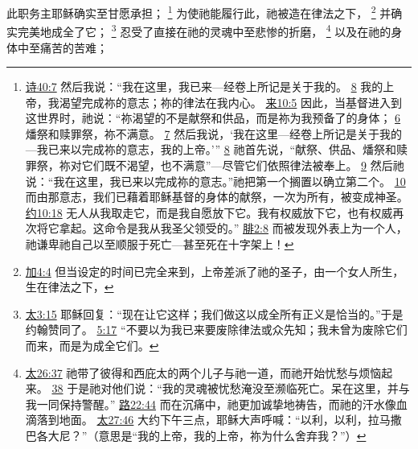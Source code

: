 \documentclass[12pt, a4paper, oneside]{ctexart}
\newcounter{parnum}[section]
\newcommand{\N}{%
   \noindent\refstepcounter{parnum}%
    \makebox[\parindent][l]{\textbf{\arabic{parnum}.}}}
\begin{document}
\N 此职务主耶稣确实至甘愿承担；
	\footnote {
		\href{https://biblehub.com/psalms/40-7.htm}{诗40:7} 然后我说：“我在这里，我已来---经卷上所记是关于我的。
		\href{https://biblehub.com/psalms/40-8.htm}{8} 我的上帝，我渴望完成祢的意志；祢的律法在我内心。
		\href{https://biblehub.com/hebrews/10-5.htm}{来10:5} 因此，当基督进入到这世界时，祂说：“祢渴望的不是献祭和供品，而是祢为我预备了的身体；
		\href{https://biblehub.com/hebrews/10-6.htm}{6} 燔祭和赎罪祭，祢不满意。
		\href{https://biblehub.com/hebrews/10-7.htm}{7} 然后我说，‘我在这里---经卷上所记是关于我的---我已来以完成祢的意志，我的上帝。’”
		\href{https://biblehub.com/hebrews/10-8.htm}{8} 祂首先说，“献祭、供品、燔祭和赎罪祭，祢对它们既不渴望，也不满意”---尽管它们依照律法被奉上。
		\href{https://biblehub.com/hebrews/10-9.htm}{9} 然后祂说：“我在这里，我已来以完成祢的意志。”祂把第一个搁置以确立第二个。
		\href{https://biblehub.com/hebrews/10-10.htm}{10} 而由那意志，我们已藉着耶稣基督的身体的献祭，一次为所有，被变成神圣。
		\href{https://biblehub.com/john/10-18.htm}{约10:18} 无人从我取走它，而是我自愿放下它。我有权威放下它，也有权威再次将它拿起。这命令是我从我圣父领受的。”
		\href{https://biblehub.com/philippians/2-8.htm}{腓2:8} 而被发现外表上为一个人，祂谦卑祂自己以至顺服于死亡---甚至死在十字架上！
	}
	为使祂能履行此，祂被造在律法之下，
	\footnote {
		\href{https://biblehub.com/galatians/4-4.htm}{加4:4} 但当设定的时间已完全来到，上帝差派了祂的圣子，由一个女人所生，生在律法之下，
	}
	并确实完美地成全了它；
	\footnote {
		\href{https://biblehub.com/matthew/3-15.htm}{太3:15} 耶稣回复：“现在让它这样；我们做这以成全所有正义是恰当的。”于是约翰赞同了。
		\href{https://biblehub.com/matthew/5-17.htm}{5:17} “不要以为我已来要废除律法或众先知；我未曾为废除它们而来，而是为成全它们。
	}
	忍受了直接在祂的灵魂中至悲惨的折磨，
	\footnote {
		\href{https://biblehub.com/matthew/26-37.htm}{太26:37} 祂带了彼得和西庇太的两个儿子与祂一道，而祂开始忧愁与烦恼起来。
		\href{https://biblehub.com/matthew/26-38.htm}{38} 于是祂对他们说：“我的灵魂被忧愁淹没至濒临死亡。呆在这里，并与我一同保持警醒。”
		\href{https://biblehub.com/luke/22-44.htm}{路22:44} 而在沉痛中，祂更加诚挚地祷告，而祂的汗水像血滴落到地面。
		\href{https://biblehub.com/matthew/27-46.htm}{太27:46} 大约下午三点，耶稣大声呼喊：“以利，以利，拉马撒巴各大尼？”（意思是“我的上帝，我的上帝，祢为什么舍弃我？”）
	}
	以及在祂的身体中至痛苦的苦难；
\end{document}
